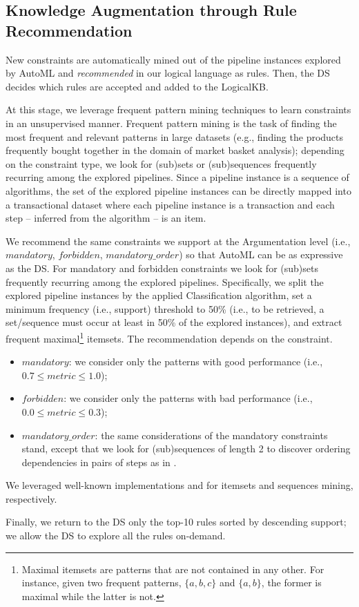 \documentclass[5p,times]{elsarticle}
\newcommand{\mf}[1]{#1}
\begin{document}
\subsection{Knowledge Augmentation through Rule Recommendation}
\mf{
New constraints are automatically mined out of the pipeline instances explored by AutoML and \emph{recommended} in our logical language as rules.
Then, the DS decides which rules are accepted and added to the LogicalKB.
}

At this stage, we leverage frequent pattern mining techniques to learn constraints in an unsupervised manner.
Frequent pattern mining is the task of finding the most frequent and relevant patterns in large datasets (e.g., finding the products frequently bought together in the domain of market basket analysis); depending on the constraint type, we look for (sub)sets \cite{srikant1995mining} or (sub)sequences \cite{srikant1996mining} frequently recurring among the explored pipelines.
Since a pipeline instance is a sequence of algorithms, the set of the explored pipeline instances can be directly mapped into a transactional dataset \cite{srikant1995mining} where each pipeline instance is a transaction and each step -- inferred from the algorithm -- is an item.

We recommend the same constraints we support at the Argumentation level (i.e., $mandatory$, $forbidden$, $mandatory\_order$) so that AutoML can be as expressive as the DS.
For mandatory and forbidden constraints we look for (sub)sets \cite{srikant1995mining} frequently recurring among the explored pipelines.
Specifically, we split the explored pipeline instances by the applied Classification algorithm, set a minimum frequency (i.e., support) threshold to 50\% (i.e., to be retrieved, a set/sequence must occur at least in 50\% of the explored instances), and extract frequent maximal\footnote{Maximal itemsets are patterns that are not contained in any other.
For instance, given two frequent patterns, $\{a, b, c\}$ and $\{a, b\}$, the former is maximal while the latter is not.
}
itemsets.
The recommendation depends on the constraint.
\begin{itemize}
    \item $mandatory$: we consider only the patterns with good performance (i.e., $0.7 \leq metric \leq 1.0$); 
    \item $forbidden$: we consider only the patterns with bad performance (i.e., $0.0 \leq metric \leq 0.3$);
    \item $mandatory\_order$: the same considerations of the mandatory constraints stand, except that we look for (sub)sequences \cite{srikant1996mining} of length 2 to discover ordering dependencies in pairs of steps as in \cite{giovanelli2021data}.   
\end{itemize}
We leveraged well-known implementations \cite{raschkas_2018_mlxtend} and \cite{seq2pat2022} for itemsets and sequences mining, respectively.
\mf{
Finally, we return to the DS only the top-10 rules sorted by descending support; we allow the DS to explore all the rules on-demand.
}
\end{document}
